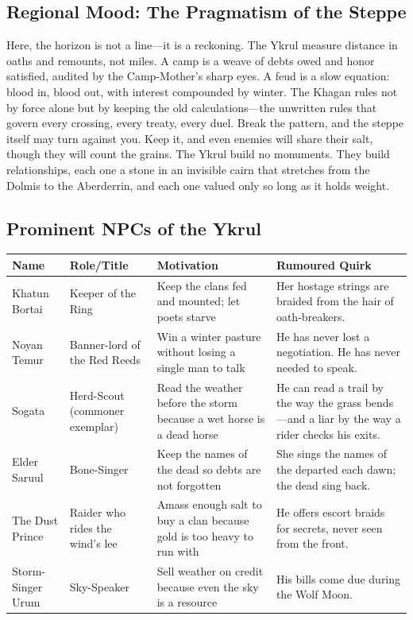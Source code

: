 \subsection{Regional Mood: The Pragmatism of the Steppe}

Here, the horizon is not a line---it is a reckoning. The Ykrul measure distance in oaths and remounts, not miles. A camp is a weave of debts owed and honor satisfied, audited by the Camp-Mother's sharp eyes. A feud is a slow equation: blood in, blood out, with interest compounded by winter. The Khagan rules not by force alone but by keeping the old calculations---the unwritten rules that govern every crossing, every treaty, every duel. Break the pattern, and the steppe itself may turn against you. Keep it, and even enemies will share their salt, though they will count the grains. The Ykrul build no monuments. They build relationships, each one a stone in an invisible cairn that stretches from the Dolmis to the Aberderrin, and each one valued only so long as it holds weight.

\subsection{Prominent NPCs of the Ykrul}
\label{sec:ykrul-npcs}

\begin{longtable}{|p{}|p{}|p{}|p{}|}
\hline
\textbf{Name} & \textbf{Role/Title} & \textbf{Motivation} & \textbf{Rumoured Quirk} \\
\hline
Khatun Bortai & Keeper of the Ring & Keep the clans fed and mounted; let poets starve & Her hostage strings are braided from the hair of oath-breakers. \\
\hline
Noyan Temur & Banner-lord of the Red Reeds & Win a winter pasture without losing a single man to talk & He has never lost a negotiation. He has never needed to speak. \\
\hline
Sogata & Herd-Scout (commoner exemplar) & Read the weather before the storm because a wet horse is a dead horse & He can read a trail by the way the grass bends---and a liar by the way a rider checks his exits. \\
\hline
Elder Saruul & Bone-Singer & Keep the names of the dead so debts are not forgotten & She sings the names of the departed each dawn; the dead sing back. \\
\hline
The Dust Prince & Raider who rides the wind's lee & Amass enough salt to buy a clan because gold is too heavy to run with & He offers escort braids for secrets, never seen from the front. \\
\hline
Storm-Singer Urum & Sky-Speaker & Sell weather on credit because even the sky is a resource & His bills come due during the Wolf Moon. \\
\hline
\end{longtable}


